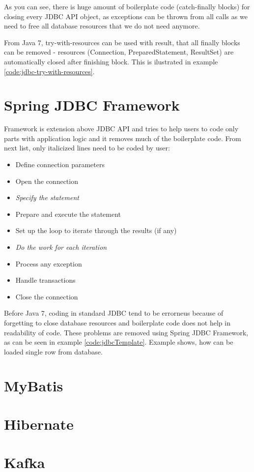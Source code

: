 As you can see, there is huge amount of boilerplate code (catch-finally blocks) for closing every JDBC API object,
as exceptions can be thrown from all calls as we need to free all database resources that we do not need anymore.

From Java 7, try-with-resources can be used with result, that all finally blocks can be removed - resources
(Connection, PreparedStatement, ResultSet) are automatically closed after finishing block.
This is ilustrated in example \ref{code:jdbc-try-with-resources}.






\section{Spring JDBC Framework}
\citet{SpringJDBC} Framework is extension above JDBC API and tries to help users to code only
parts with application logic and it removes much of the boilerplate code.
From next list, only italicized lines need to be coded by user:
\begin{itemize}
  \item Define connection parameters
  \item Open the connection
  \item \textit{Specify the statement}
  \item Prepare and execute the statement
  \item Set up the loop to iterate through the results (if any)
  \item \textit{Do the work for each iteration}
  \item Process any exception
  \item Handle transactions
  \item Close the connection   
\end{itemize}
Before Java 7, coding in standard JDBC tend to be errorneus because of forgetting to close
database resources and boilerplate code does not help in readability of code.
These problems are removed using Spring JDBC Framework, as can be seen in example \ref{code:jdbcTemplate}.
Example shows, how can be loaded single row from database.







\section{MyBatis}
\section{Hibernate}
\section{Kafka}

